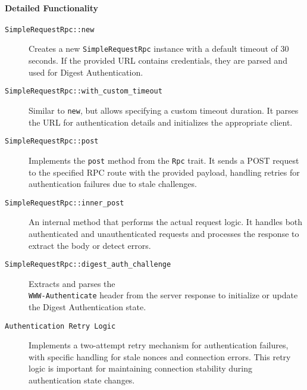 \documentclass[12pt,a4paper]{article}
\begin{document}
\paragraph{Detailed Functionality}
\begin{description}
    \item[\texttt{SimpleRequestRpc::new}]
    Creates a new \texttt{SimpleRequestRpc} instance with a default timeout of 30 seconds.  If the provided URL contains credentials, they are parsed and used for Digest Authentication. %

    \item[\texttt{SimpleRequestRpc::with\_custom\_timeout}]
    Similar to \texttt{new}, but allows specifying a custom timeout duration.  It parses the URL for authentication details and initializes the appropriate client. %

    \item[\texttt{SimpleRequestRpc::post}]
    Implements the \texttt{post} method from the \texttt{Rpc} trait.  It sends a POST request to the specified RPC route with the provided payload, handling retries for authentication failures due to stale challenges. %

    \item[\texttt{SimpleRequestRpc::inner\_post}]
    An internal method that performs the actual request logic.  It handles both authenticated and unauthenticated requests and processes the response to extract the body or detect errors. %

    \item[\texttt{SimpleRequestRpc::digest\_auth\_challenge}]
    Extracts and parses the \\\texttt{WWW-Authenticate} header from the server response to initialize or update the Digest Authentication state. %

    \item[\texttt{Authentication Retry Logic}]
    Implements a two-attempt retry mechanism for authentication failures, with specific handling for stale nonces and connection errors.  This retry logic is important for maintaining connection stability during authentication state changes. %
\end{description}
\end{document}
